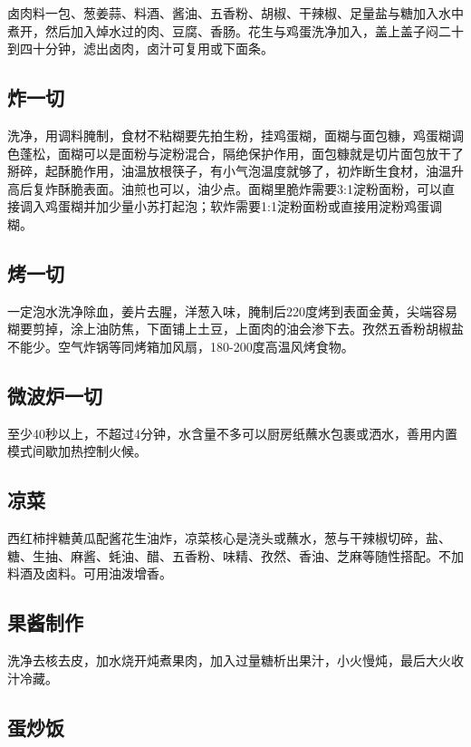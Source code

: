 \documentclass[
  letterpaper,
  DIV=11,
  numbers=noendperiod]{scrreprt}
\begin{document}
卤肉料一包、葱姜蒜、料酒、酱油、五香粉、胡椒、干辣椒、足量盐与糖加入水中煮开，然后加入焯水过的肉、豆腐、香肠。花生与鸡蛋洗净加入，盖上盖子闷二十到四十分钟，滤出卤肉，卤汁可复用或下面条。

\subsection{炸一切}\label{ux70b8ux4e00ux5207}

洗净，用调料腌制，食材不粘糊要先拍生粉，挂鸡蛋糊，面糊与面包糠，鸡蛋糊调色蓬松，面糊可以是面粉与淀粉混合，隔绝保护作用，面包糠就是切片面包放干了掰碎，起酥脆作用，油温放根筷子，有小气泡温度就够了，初炸断生食材，油温升高后复炸酥脆表面。油煎也可以，油少点。面糊里脆炸需要3:1淀粉面粉，可以直接调入鸡蛋糊并加少量小苏打起泡；软炸需要1:1淀粉面粉或直接用淀粉鸡蛋调糊。

\subsection{烤一切}\label{ux70e4ux4e00ux5207}

一定泡水洗净除血，姜片去腥，洋葱入味，腌制后220度烤到表面金黄，尖端容易糊要剪掉，涂上油防焦，下面铺上土豆，上面肉的油会渗下去。孜然五香粉胡椒盐不能少。空气炸锅等同烤箱加风扇，180-200度高温风烤食物。

\subsection{微波炉一切}\label{ux5faeux6ce2ux7089ux4e00ux5207}

至少40秒以上，不超过4分钟，水含量不多可以厨房纸蘸水包裹或洒水，善用内置模式间歇加热控制火候。

\subsection{凉菜}\label{ux51c9ux83dc}

西红柿拌糖黄瓜配酱花生油炸，凉菜核心是浇头或蘸水，葱与干辣椒切碎，盐、糖、生抽、麻酱、蚝油、醋、五香粉、味精、孜然、香油、芝麻等随性搭配。不加料酒及卤料。可用油泼增香。

\subsection{果酱制作}\label{ux679cux9171ux5236ux4f5c}

洗净去核去皮，加水烧开炖煮果肉，加入过量糖析出果汁，小火慢炖，最后大火收汁冷藏。

\subsection{蛋炒饭}\label{ux86cbux7092ux996d}
\end{document}
